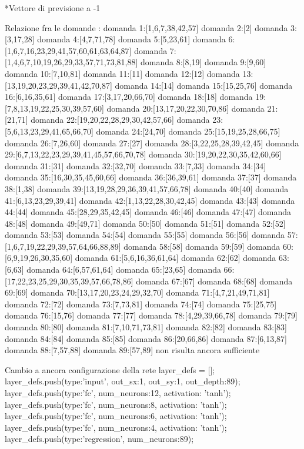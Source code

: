 *Vettore di previsione a -1

Relazione fra le domande :
domanda 1:[1,6,7,38,42,57]
domanda 2:[2]
domanda 3:[3,17,28]
domanda 4:[4,7,71,78]
domanda 5:[5,23,61]
domanda 6:[1,6,7,16,23,29,41,57,60,61,63,64,87]
domanda 7:[1,4,6,7,10,19,26,29,33,57,71,73,81,88]
domanda 8:[8,19]
domanda 9:[9,60]
domanda 10:[7,10,81]
domanda 11:[11]
domanda 12:[12]
domanda 13:[13,19,20,23,29,39,41,42,70,87]
domanda 14:[14]
domanda 15:[15,25,76]
domanda 16:[6,16,35,61]
domanda 17:[3,17,20,66,70]
domanda 18:[18]
domanda 19:[7,8,13,19,22,25,30,39,57,60]
domanda 20:[13,17,20,22,30,70,86]
domanda 21:[21,71]
domanda 22:[19,20,22,28,29,30,42,57,66]
domanda 23:[5,6,13,23,29,41,65,66,70]
domanda 24:[24,70]
domanda 25:[15,19,25,28,66,75]
domanda 26:[7,26,60]
domanda 27:[27]
domanda 28:[3,22,25,28,39,42,45]
domanda 29:[6,7,13,22,23,29,39,41,45,57,66,70,78]
domanda 30:[19,20,22,30,35,42,60,66]
domanda 31:[31]
domanda 32:[32,70]
domanda 33:[7,33]
domanda 34:[34]
domanda 35:[16,30,35,45,60,66]
domanda 36:[36,39,61]
domanda 37:[37]
domanda 38:[1,38]
domanda 39:[13,19,28,29,36,39,41,57,66,78]
domanda 40:[40]
domanda 41:[6,13,23,29,39,41]
domanda 42:[1,13,22,28,30,42,45]
domanda 43:[43]
domanda 44:[44]
domanda 45:[28,29,35,42,45]
domanda 46:[46]
domanda 47:[47]
domanda 48:[48]
domanda 49:[49,71]
domanda 50:[50]
domanda 51:[51]
domanda 52:[52]
domanda 53:[53]
domanda 54:[54]
domanda 55:[55]
domanda 56:[56]
domanda 57:[1,6,7,19,22,29,39,57,64,66,88,89]
domanda 58:[58]
domanda 59:[59]
domanda 60:[6,9,19,26,30,35,60]
domanda 61:[5,6,16,36,61,64]
domanda 62:[62]
domanda 63:[6,63]
domanda 64:[6,57,61,64]
domanda 65:[23,65]
domanda 66:[17,22,23,25,29,30,35,39,57,66,78,86]
domanda 67:[67]
domanda 68:[68]
domanda 69:[69]
domanda 70:[13,17,20,23,24,29,32,70]
domanda 71:[4,7,21,49,71,81]
domanda 72:[72]
domanda 73:[7,73,81]
domanda 74:[74]
domanda 75:[25,75]
domanda 76:[15,76]
domanda 77:[77]
domanda 78:[4,29,39,66,78]
domanda 79:[79]
domanda 80:[80]
domanda 81:[7,10,71,73,81]
domanda 82:[82]
domanda 83:[83]
domanda 84:[84]
domanda 85:[85]
domanda 86:[20,66,86]
domanda 87:[6,13,87]
domanda 88:[7,57,88]
domanda 89:[57,89]
 non risulta ancora sufficiente

Cambio a ancora configurazione della rete
layer_defs = [];
layer_defs.push({type:'input', out_sx:1, out_sy:1, out_depth:89});
layer_defs.push({type:'fc', num_neurons:12, activation: 'tanh'});
layer_defs.push({type:'fc', num_neurons:8, activation: 'tanh'});
layer_defs.push({type:'fc', num_neurons:6, activation: 'tanh'});
layer_defs.push({type:'fc', num_neurons:4, activation: 'tanh'});
layer_defs.push({type:'regression', num_neurons:89});

